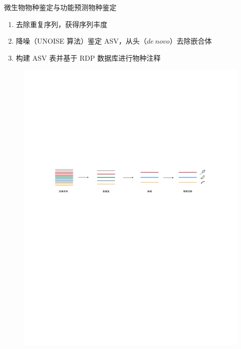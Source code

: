 \documentclass{beamer}
\begin{document}
	\begin{frame}{微生物物种鉴定与功能预测}{物种鉴定}
		\begin{enumerate}
			\item 去除重复序列，获得序列丰度
			\item 降噪（UNOISE 算法）鉴定 ASV，从头（$de~novo$）去除嵌合体
			\item 构建 ASV 表并基于 RDP 数据库进行物种注释
		\end{enumerate}

		\begin{figure}
			\centering
			\includegraphics[width=\textwidth]{img/分析流程.pdf}
		\end{figure}
	\end{frame}
\end{document}
